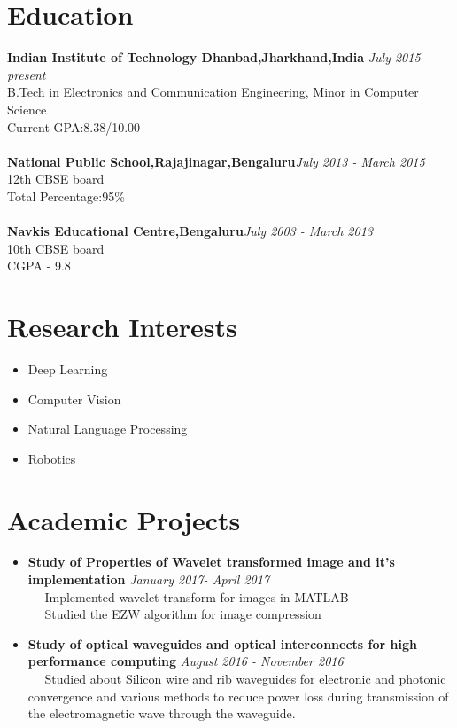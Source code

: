 \documentclass[margin, centered]{res}
\begin{document}
\begin{resume}

\section{\textbf{Education}}

\textbf{Indian Institute of Technology Dhanbad,Jharkhand,India} \hfill\textit{ July 2015 - present}\\
B.Tech in Electronics and Communication Engineering, Minor in Computer Science\\
Current GPA:8.38/10.00\\ \\
\textbf{National Public School,Rajajinagar,Bengaluru}\hfill\textit{July 2013 - March 2015}\\
12th CBSE board\\
Total Percentage:95\%\\ \\
\textbf{Navkis Educational Centre,Bengaluru}\hfill\textit{July 2003 - March 2013}\\
10th CBSE board\\
CGPA - 9.8\\

\section{\textbf{Research Interests}}
\begin{itemize}
\item Deep Learning
\item Computer Vision
\item Natural Language Processing
\item Robotics
\end{itemize}

\section{\textbf{Academic Projects}}
\begin{itemize}
\item \textbf{Study of Properties of Wavelet transformed image and it's implementation} \hfill\textit{January 2017- April 2017}\\
~\textbullet~ Implemented wavelet transform for images in MATLAB\\
~\textbullet~ Studied the EZW algorithm for image compression 

\item \textbf{Study of optical waveguides and optical interconnects for high performance computing} \hfill\textit{August 2016 - November 2016}\\
~\textbullet~ Studied about Silicon wire and rib waveguides for electronic and photonic convergence and various methods to reduce power loss during transmission of the electromagnetic wave through the waveguide.\\
\end{itemize}


\end{resume}
\end{document}
